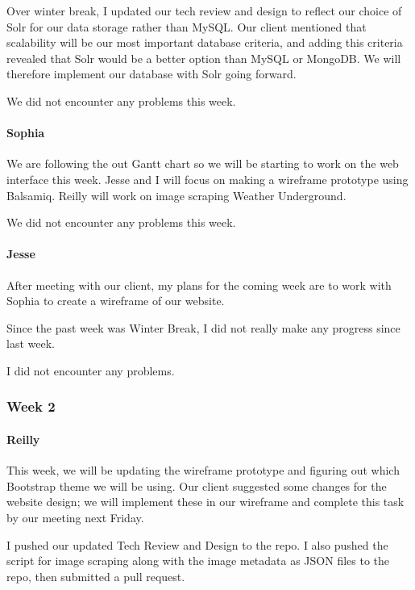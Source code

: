 \documentclass[onecolumn, draftclsnofoot,10pt, compsoc]{IEEEtran}
\begin{document}
\begin{flushleft}
 
Over winter break, I updated our tech review and design to reflect our choice of Solr for our data storage rather than MySQL. Our client mentioned that scalability will be our most important database criteria, and adding this criteria revealed that Solr would be a better option than MySQL or MongoDB. We will therefore implement our database with Solr going forward.
 
 
We did not encounter any problems this week.
 
\paragraph{Sophia}
 
We are following the out Gantt chart so we will be starting to work on the web interface this week. Jesse and I will focus on making a wireframe prototype using Balsamiq. Reilly will work on image scraping Weather Underground.
 
 
We did not encounter any problems this week.
 
\paragraph{Jesse}
 
After meeting with our client, my plans for the coming week are to work with Sophia to create a wireframe of our website.
 
 
Since the past week was Winter Break, I did not really make any progress since last week.
 
 
I did not encounter any problems.
 
\subsubsection{Week 2}
\paragraph{Reilly}
 
This week, we will be updating the wireframe prototype and figuring out which Bootstrap theme we will be using. Our client suggested some changes for the website design; we will implement these in our wireframe and complete this task by our meeting next Friday.
 
 
I pushed our updated Tech Review and Design to the repo. I also pushed the script for image scraping along with the image metadata as JSON files to the repo, then submitted a pull request.
 

\end{flushleft}
\end{document}
